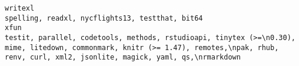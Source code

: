 \documentclass[
  letterpaper,
  DIV=11,
  numbers=noendperiod]{scrreprt}
\begin{document}
\begin{verbatim}
writexl                                                                                                                                                                                                                                                                                                                                                                                                                                                                                                                                                                                                                                                                                                                                                                                                                                                                                                                                                                                                                                                                                                                                                                                                                                                       spelling, readxl, nycflights13, testthat, bit64
xfun                                                                                                                                                                                                                                                                                                                                                                                                                                                                                                                                                                                                                                                                                                                                                                                                                                                                                                                                                                                                                                                                                                         testit, parallel, codetools, methods, rstudioapi, tinytex (>=\n0.30), mime, litedown, commonmark, knitr (>= 1.47), remotes,\npak, rhub, renv, curl, xml2, jsonlite, magick, yaml, qs,\nrmarkdown

\end{verbatim}
\end{document}
